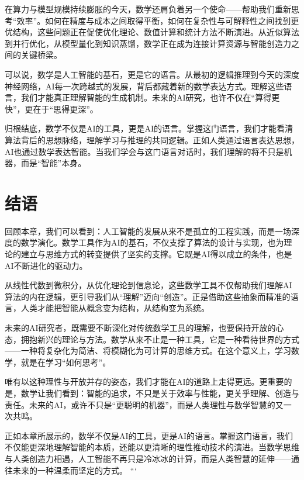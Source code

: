 在算力与模型规模持续膨胀的今天，数学还肩负着另一个使命——帮助我们重新思考“效率”。如何在精度与成本之间取得平衡，如何在复杂性与可解释性之间找到更优结构，这些问题正在促使优化理论、数值计算和统计方法不断演进。从近似算法到并行优化，从模型量化到知识蒸馏，数学正在成为连接计算资源与智能创造力之间的关键桥梁。

可以说，数学是人工智能的基石，更是它的语言。从最初的逻辑推理到今天的深度神经网络，AI每一次跨越式的发展，背后都藏着新的数学表达方式。理解这些语言，我们才能真正理解智能的生成机制。未来的AI研究，也许不仅在“算得更快”，更在于“思得更深”。

归根结底，数学不仅是AI的工具，更是AI的语言。掌握这门语言，我们才能看清算法背后的思想脉络，理解学习与推理的共同逻辑。正如人类通过语言表达思想，AI也通过数学表达智能。当我们学会与这门语言对话时，我们理解的将不只是机器，而是“智能”本身。

\section{结语}

回顾本章，我们可以看到：人工智能的发展从来不是孤立的工程实践，而是一场深度的数学演化。数学工具作为AI的基石，不仅支撑了算法的设计与实现，也为理论的建立与思维方式的转变提供了坚实的支撑。它既是AI得以成立的条件，也是AI不断进化的驱动力。

从线性代数到微积分，从优化理论到信息论，这些数学工具不仅帮助我们理解AI算法的内在逻辑，更引导我们从“理解”迈向“创造”。正是借助这些抽象而精准的语言，人类才能把智能从概念变为结构，从结构变为系统。

未来的AI研究者，既需要不断深化对传统数学工具的理解，也要保持开放的心态，拥抱新兴的理论与方法。数学从来不止是一种工具，它是一种看待世界的方式——一种将复杂化为简洁、将模糊化为可计算的思维方式。在这个意义上，学习数学，就是在学习“如何思考”。

唯有以这种理性与开放并存的姿态，我们才能在AI的道路上走得更远。更重要的是，数学让我们看到：智能的追求，不只是关于效率与性能，更关乎理解、创造与责任。未来的AI，或许不只是“更聪明的机器”，而是人类理性与数学智慧的又一次共鸣。

正如本章所展示的，数学不仅是AI的工具，更是AI的语言。掌握这门语言，我们不仅能更深地理解智能的本质，还能以更清晰的理性推动技术的演进。当数学思维与人类创造力相遇，人工智能不再只是冷冰冰的计算，而是人类智慧的延伸——通往未来的一种温柔而坚定的方式。
```
